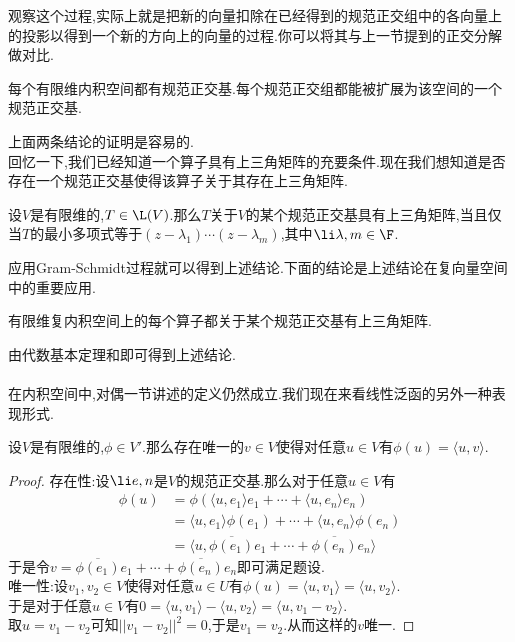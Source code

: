 \documentclass{ctexart}
\begin{document}
观察这个过程,实际上就是把新的向量扣除在已经得到的规范正交组中的各向量上的投影以得到一个新的方向上的向量的过程.你可以将其与上一节提到的正交分解做对比.
\begin{formal}[1.8 规范正交基的存在性]
    每个有限维内积空间都有规范正交基.每个规范正交组都能被扩展为该空间的一个规范正交基.
\end{formal}\noindent
上面两条结论的证明是容易的.\\
回忆一下,我们已经知道一个算子具有上三角矩阵的充要条件.现在我们想知道是否存在一个规范正交基使得该算子关于其存在上三角矩阵.
\begin{formal}[1.9 关于规范正交基有上三角矩阵]
    设$V$是有限维的,$T\in\L(V)$.那么$T$关于$V$的某个规范正交基具有上三角矩阵,当且仅当$T$的最小多项式等于$(z-\lambda_1)\cdots(z-\lambda_m)$,其中$\li\lambda,m\in\F$.
\end{formal}\noindent
应用Gram-Schmidt过程就可以得到上述结论.下面的结论是上述结论在复向量空间中的重要应用.
\begin{formal}[1.10 Schur定理]
    有限维复内积空间上的每个算子都关于某个规范正交基有上三角矩阵.
\end{formal}\noindent
由代数基本定理和即可得到上述结论.\\
\\
在内积空间中,对偶一节讲述的定义仍然成立.我们现在来看线性泛函的另外一种表现形式.
\begin{formal}[2.1 Riesz定理]
    设$V$是有限维的,$\phi\in V'$.那么存在唯一的$v\in V$使得对任意$u\in V$有$\phi(u)=\langle u,v\rangle$.
\end{formal}
\begin{proof}
    存在性:设$\li e,n$是$V$的规范正交基.那么对于任意$u\in V$有
    $$\begin{aligned}
        \phi(u)
        &= \phi\left(\langle u,e_1\rangle e_1+\cdots+\langle u,e_n\rangle e_n\right) \\
        &= \langle u,e_1\rangle \phi(e_1)+\cdots+\langle u,e_n\rangle\phi(e_n) \\
        &= \langle u,\overline{\phi(e_1)}e_1+\cdots+\overline{\phi(e_n)}e_n\rangle
    \end{aligned}$$
    于是令$v=\overline{\phi(e_1)}e_1+\cdots+\overline{\phi(e_n)}e_n$即可满足题设.\\
    唯一性:设$v_1,v_2\in V$使得对任意$u\in U$有$\phi(u)=\langle u,v_1\rangle=\langle u,v_2\rangle$.\\
    于是对于任意$u\in V$有$0=\langle u,v_1\rangle-\langle u,v_2\rangle=\langle u,v_1-v_2\rangle$.\\
    取$u=v_1-v_2$可知$||v_1-v_2||^2=0$,于是$v_1=v_2$.从而这样的$v$唯一.
\end{proof}
\end{document}
